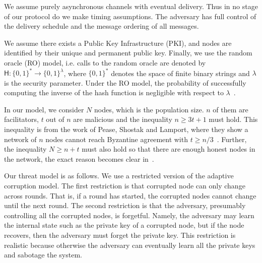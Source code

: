 We assume purely asynchronous channels with eventual delivery.
Thus in no stage of our protocol do we make timing assumptions.
The adversary has full control of the delivery schedule and the message ordering of all messages.

We assume there exists a Public Key Infrastructure (PKI), and nodes are identified by their unique and permanent public key.
Finally, we use the random oracle (RO) model, i.e. calls to the random oracle are denoted by $\textsf{H}: \{0, 1\}^* \rightarrow \{0, 1\}^\lambda$,
where $\{0, 1\}^*$ denotes the space of finite binary strings and $\lambda$ is the security parameter.
Under the RO model, the probability of successfully computing the inverse of the hash function is negligible with respect to $\lambda$~\cite{bellare1993random}.

In our model, we consider $N$ nodes, which is the population size.
$n$ of them are facilitators, $t$ out of $n$ are malicious and the inequality
$n \ge 3t + 1$ must hold.
This inequality is from the work of Pease, Shostak and Lamport, where they show a network of $n$ nodes cannot reach Byzantine agreement with $t \ge n/3$~\cite{pease1980reaching}.
Further, the inequality $N \ge n + t$ must also hold so that there are enough honest nodes in the network,
the exact reason becomes clear in~.

Our threat model is as follows. 
We use a restricted version of the adaptive corruption model.
The first restriction is that corrupted node can only change across rounds.
That is, if a round has started, the corrupted nodes cannot change until the next round.
The second restriction is that the adversary, presumably controlling all the corrupted nodes, is forgetful.
Namely, the adversary may learn the internal state such as the private key of a corrupted node,
but if the node recovers, then the adversary must forget the private key.
This restriction is realistic because otherwise the adversary can eventually learn all the private keys and sabotage the system.

